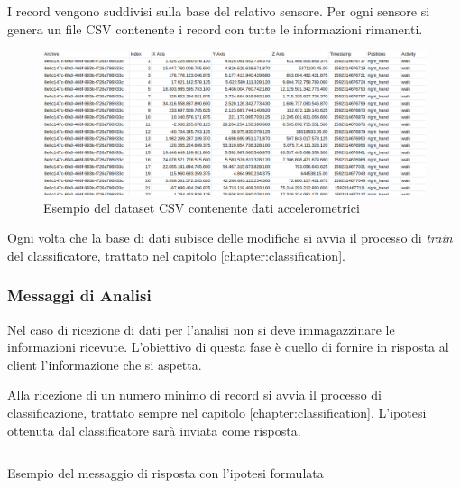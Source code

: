 \vspace{5mm} %
I record vengono suddivisi sulla base del relativo sensore. Per ogni sensore si genera un file CSV contenente i record con tutte 
le informazioni rimanenti.

\begin{figure}[H]
    \centering
    \includegraphics[scale = 0.39]{assets/images/examples/dataset-data-example.png}
    \caption{Esempio del dataset CSV contenente dati accelerometrici}
    \label{fig:example-dataset-csv-accelerometer}
\end{figure}

Ogni volta che la base di dati subisce delle modifiche si avvia il processo di \textit{train} del classificatore, 
trattato nel capitolo \ref{chapter:classification}.


\subsubsection{Messaggi di Analisi}
Nel caso di ricezione di dati per l'analisi non si deve immagazzinare le informazioni ricevute. 
L'obiettivo di questa fase è quello di fornire in risposta al client l'informazione che si aspetta.

Alla ricezione di un numero minimo di record si avvia il processo di classificazione, trattato sempre nel capitolo \ref{chapter:classification}.
L'ipotesi ottenuta dal classificatore sarà inviata come risposta.

\begin{listing}[H] 
    \inputminted[frame=single,framesep=10pt]{json}{assets/snippets/server/receiver/prediction.json}
    \caption{Esempio del messaggio di risposta con l'ipotesi formulata}
\end{listing}